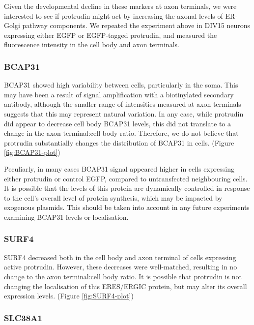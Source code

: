 \documentclass[
  12pt,
  a4paper,
]{book}
\begin{document}
Given the developmental decline in these markers at axon terminals, we were interested to see if protrudin might act by increasing the axonal levels of ER-Golgi pathway components. We repeated the experiment above in DIV15 neurons expressing either EGFP or EGFP-tagged protrudin, and measured the fluorescence intensity in the cell body and axon terminals.

\hypertarget{bcap31}{%
\subsubsection{BCAP31}\label{bcap31}}

BCAP31 showed high variability between cells, particularly in the soma. This may have been a result of signal amplification with a biotinylated secondary antibody, although the smaller range of intensities measured at axon terminals suggests that this may represent natural variation. In any case, while protrudin did appear to decrease cell body BCAP31 levels, this did not translate to a change in the axon terminal:cell body ratio. Therefore, we do not believe that protrudin substantially changes the distribution of BCAP31 in cells. (Figure \ref{fig:BCAP31-plot})

Peculiarly, in many cases BCAP31 signal appeared higher in cells expressing either protrudin or control EGFP, compared to untransfected neighbouring cells. It is possible that the levels of this protein are dynamically controlled in response to the cell's overall level of protein synthesis, which may be impacted by exogenous plasmids. This should be taken into account in any future experiments examining BCAP31 levels or localisation.

\hypertarget{surf4}{%
\subsubsection{SURF4}\label{surf4}}

SURF4 decreased both in the cell body and axon terminal of cells expressing active protrudin. However, these decreases were well-matched, resulting in no change to the axon terminal:cell body ratio. It is possible that protrudin is not changing the localisation of this ERES/ERGIC protein, but may alter its overall expression levels. (Figure \ref{fig:SURF4-plot})

\hypertarget{slc38a1}{%
\subsubsection{SLC38A1}\label{slc38a1}}
\end{document}
